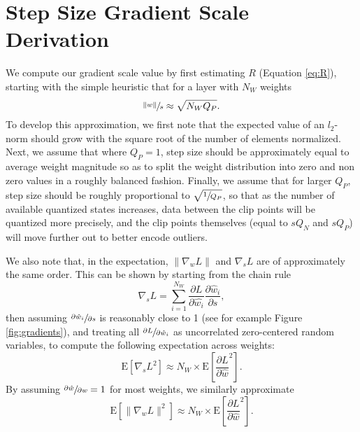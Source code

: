 \documentclass{article}
\begin{document}
\appendix

\section{Step Size Gradient Scale Derivation}
\label{a:gradscale}


We compute our gradient scale value by first estimating $R$ (Equation \ref{eq:R}), starting with the simple heuristic that for a layer with $N_W$ weights
\begin{equation}
\sfrac{\lVert w \rVert}{ s } \approx \sqrt{N_W Q_P}.
\end{equation}
To develop this approximation, we first note that the expected value of an $l_2$-norm should grow with the square root of the number of elements normalized.
Next, we assume that where $Q_P=1$, step size should be approximately equal to average weight magnitude so as to split the weight distribution into zero and non zero values in a roughly balanced fashion.
Finally, we assume that for larger $Q_P$, step size should be roughly proportional to $\sqrt{\sfrac{1}{Q_P}}$, so that as the number of available quantized states increases, data between the clip points will be quantized more precisely, and the clip points themselves (equal to $sQ_N$ and $sQ_P$) will move further out to better encode outliers.

We also note that, in the expectation, $\lVert \nabla_w L \rVert$ and $\nabla_s L$ are of approximately the same order.
This can be shown by starting from the chain rule
\begin{equation}
	\nabla_s L = \sum_{i=1}^{N_W} \frac{\partial L}{\partial \hat{w_i}} \frac{\partial \hat{w}_i}{\partial s},
\end{equation}
then assuming $\sfrac{\partial \hat{w}_i}{\partial s}$ is reasonably close to 1 (see for example Figure \ref{fig:gradients}), and treating all $\sfrac{\partial L}{\partial \hat{w}_i}$ as uncorrelated zero-centered random variables, to compute the following expectation across weights:
\begin{equation}
	\text{E} \left[  \nabla_s L^2 \right] \approx
		N_W \times \text{E} \left[ \frac{\partial L}{\partial \hat{w}}^2 \right].
\end{equation}
By assuming $\sfrac{\partial \hat{w}}{\partial w}=1$ for most weights, we similarly approximate
\begin{equation}
	\text{E} \left[ \lVert \nabla_w L \rVert^2 \right] \approx
		N_W \times \text{E} \left[ \frac{\partial L}{\partial \hat{w}}^2 \right].
\end{equation}
\end{document}
